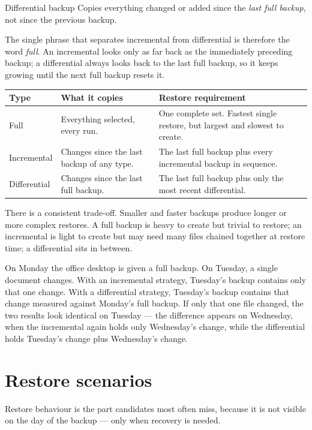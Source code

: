 \begin{definitionbox}{Differential backup}
Copies everything changed or added since the \emph{last full backup}, not
since the previous backup.
\end{definitionbox}

The single phrase that separates incremental from differential is therefore
the word \emph{full}. An incremental looks only as far back as the
immediately preceding backup; a differential always looks back to the last
full backup, so it keeps growing until the next full backup resets it.

\begin{center}
\begin{tabular}{p{}p{}p{}}
\toprule
\textbf{Type} & \textbf{What it copies} & \textbf{Restore requirement}\\
\midrule
Full & Everything selected, every run. & One complete set. Fastest single restore, but largest and slowest to create.\\
Incremental & Changes since the last backup of any type. & The last full backup plus every incremental backup in sequence.\\
Differential & Changes since the last full backup. & The last full backup plus only the most recent differential.\\
\bottomrule
\end{tabular}
\end{center}

There is a consistent trade-off. Smaller and faster backups produce longer or
more complex restores. A full backup is heavy to create but trivial to
restore; an incremental is light to create but may need many files chained
together at restore time; a differential sits in between.

\begin{example}
On Monday the office desktop is given a full backup. On Tuesday, a single
document changes. With an incremental strategy, Tuesday's backup contains
only that one change. With a differential strategy, Tuesday's backup contains
that change measured against Monday's full backup. If only that one file
changed, the two results look identical on Tuesday --- the difference appears
on Wednesday, when the incremental again holds only Wednesday's change, while
the differential holds Tuesday's change plus Wednesday's change.
\end{example}

\section{Restore scenarios}
Restore behaviour is the part candidates most often miss, because it is not
visible on the day of the backup --- only when recovery is needed.

